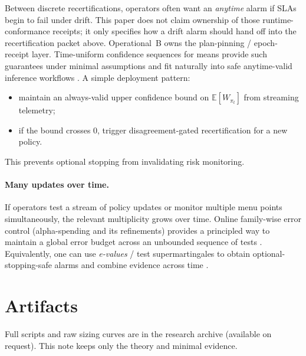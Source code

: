 \documentclass[11pt]{article}
\begin{document}
Between discrete recertifications, operators often want an \emph{anytime} alarm if SLAs begin to fail under drift. This paper does not claim ownership of those runtime-conformance receipts; it only specifies how a drift alarm should hand off into the recertification packet above. Operational~B owns the plan-pinning / epoch-receipt layer.\cite{series:operationalB}
Time-uniform confidence sequences for means provide such guarantees under minimal assumptions \cite{howard2021} and fit naturally into safe anytime-valid inference workflows \cite{ramdas2023savi}.
A simple deployment pattern:
\begin{itemize}
  \item maintain an always-valid upper confidence bound on $\mathbb{E}[W_{\pi_t}]$ from streaming telemetry;
  \item if the bound crosses $0$, trigger disagreement-gated recertification for a new policy.
\end{itemize}
This prevents optional stopping from invalidating risk monitoring.

\paragraph{Many updates over time.}
If operators test a stream of policy updates or monitor multiple menu points simultaneously, the relevant multiplicity grows over time.
Online family-wise error control (alpha-spending and its refinements) provides a principled way to maintain a global error budget across an unbounded sequence of tests \cite{tian2021onlinefwer}.
Equivalently, one can use \emph{e-values} / test supermartingales to obtain optional-stopping-safe alarms and combine evidence across time \cite{ramdas2025evals,vovk2021evals,hartog2025efwer}.


\section*{Artifacts}
Full scripts and raw sizing curves are in the research archive (available on request). This note keeps only the theory and minimal evidence.
\end{document}
